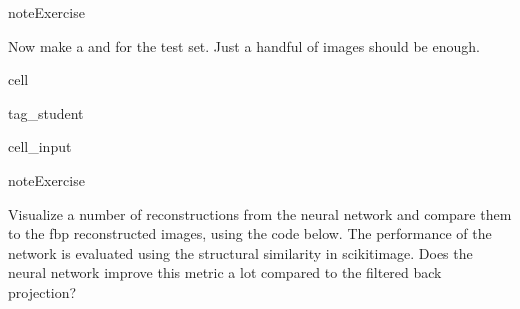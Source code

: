 \documentclass[letterpaper,10pt,english]{jupyterBook}
\begin{document}
\begin{sphinxadmonition}{note}{Exercise}

\sphinxAtStartPar
Now make a  and  for the test set. Just a handful of images should be enough.
\end{sphinxadmonition}

\begin{sphinxuseclass}{cell}
\begin{sphinxuseclass}{tag_student}\begin{sphinxVerbatimInput}

\begin{sphinxuseclass}{cell_input}
\begin{sphinxVerbatim}[commandchars=\\\{\}]
 

  
  

   
\end{sphinxVerbatim}

\end{sphinxuseclass}\end{sphinxVerbatimInput}

\end{sphinxuseclass}
\end{sphinxuseclass}
\begin{sphinxadmonition}{note}{Exercise}

\sphinxAtStartPar
Visualize a number of reconstructions from the neural network and compare them to the fbp reconstructed images, using the code below. The performance of the network is evaluated using the structural similarity  in scikit\sphinxhyphen{}image. Does the neural network improve this metric a lot compared to the filtered back projection?
\end{sphinxadmonition}
\end{document}
